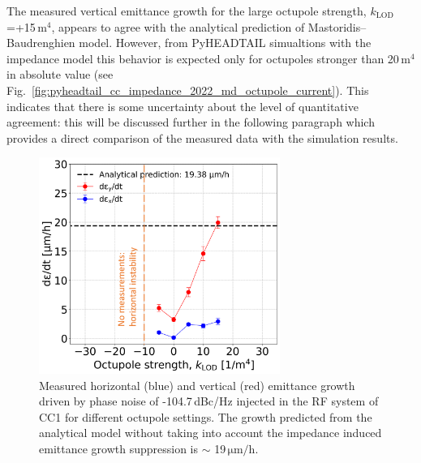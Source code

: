 The measured vertical emittance growth for the large octupole strength, $k_\mathrm{LOD}$=+15\,$\mathrm{m^4}$, appears to agree with the analytical prediction of Mastoridis--Baudrenghien model. However, from PyHEADTAIL simualtions with the impedance model this behavior is expected only for octupoles stronger than 20\,$\mathrm{m^4}$ in absolute value (see Fig.~\ref{fig:pyheadtail_cc_impedance_2022_md_octupole_current}). This indicates that there is some uncertainty about the level of quantitative agreement: this will be discussed further in the following paragraph which provides a direct comparison of the measured data with the simulation results.


\begin{figure}[!h]
   \centering         
   \includegraphics[width=0.7\textwidth]{images/Ch8/emit_H_and_V_octupole_scan_background_growth_subtracted_modified.png}
       \caption{Measured horizontal (blue) and vertical (red) emittance growth driven by phase noise of -104.7\,dBc/Hz injected in the RF system of CC1 for different octupole settings. The growth predicted from the analytical model without taking into account the impedance induced emittance growth suppression is $\sim$ 19\,$\mathrm{\mu m/h}$.}
       \label{fig:H_V_emit_growth_background_subtracted_octupole_scan}
\end{figure}

